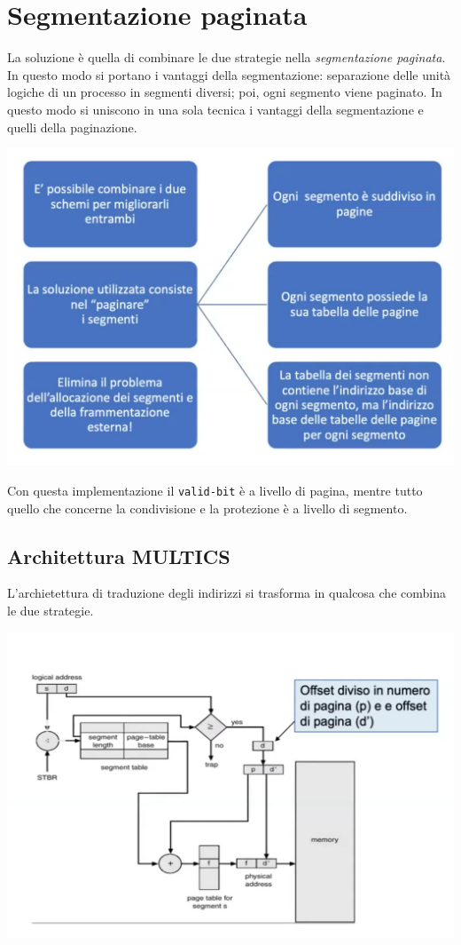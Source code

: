 \documentclass[a4paper,12pt, twoside]{report}
\begin{document}
\newpage
\section{Segmentazione paginata}

La soluzione \`e quella di combinare le due strategie nella \emph{segmentazione paginata}. In questo 
modo si portano i vantaggi della segmentazione: separazione delle unit\`a logiche di un processo in 
segmenti diversi; poi, ogni segmento viene paginato. In questo modo si uniscono in una sola tecnica i 
vantaggi della segmentazione e quelli della paginazione. 

\begin{center}
    \includegraphics[scale=0.25]{seg_pag}
\end{center}

Con questa implementazione il \texttt{valid-bit} \`e a livello di pagina, mentre tutto quello che 
concerne la condivisione e la protezione \`e a livello di segmento. 

\newpage
\subsection{Architettura MULTICS}
L'archietettura di traduzione degli indirizzi si trasforma in qualcosa che combina le due strategie.
\begin{center}
    \includegraphics[scale=0.2]{multics}
\end{center} 
\end{document}
